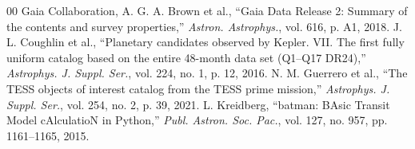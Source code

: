 \documentclass[conference,a4paper]{IEEEtran}
\begin{document}
\begin{thebibliography}{00}
 Gaia Collaboration, A. G. A. Brown et al., ``Gaia Data Release 2: Summary of the contents and survey properties,'' \textit{Astron. Astrophys.}, vol. 616, p. A1, 2018.
 J. L. Coughlin et al., ``Planetary candidates observed by Kepler. VII. The first fully uniform catalog based on the entire 48-month data set (Q1--Q17 DR24),'' \textit{Astrophys. J. Suppl. Ser.}, vol. 224, no. 1, p. 12, 2016.
 N. M. Guerrero et al., ``The TESS objects of interest catalog from the TESS prime mission,'' \textit{Astrophys. J. Suppl. Ser.}, vol. 254, no. 2, p. 39, 2021.
 L. Kreidberg, ``batman: BAsic Transit Model cAlculatioN in Python,'' \textit{Publ. Astron. Soc. Pac.}, vol. 127, no. 957, pp. 1161--1165, 2015.
\end{thebibliography}
\end{document}
